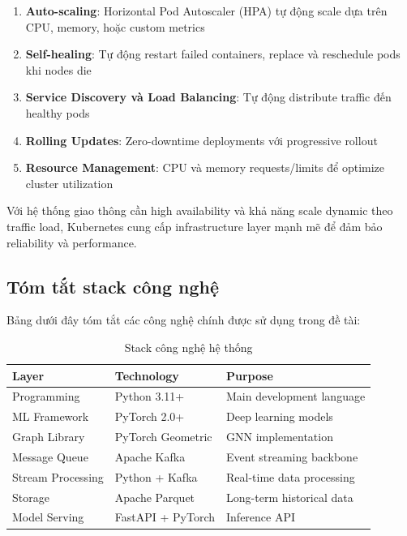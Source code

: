 \begin{enumerate}
    \item \textbf{Auto-scaling}: Horizontal Pod Autoscaler (HPA) tự động scale dựa trên CPU, memory, hoặc custom metrics
    
    \item \textbf{Self-healing}: Tự động restart failed containers, replace và reschedule pods khi nodes die
    
    \item \textbf{Service Discovery và Load Balancing}: Tự động distribute traffic đến healthy pods
    
    \item \textbf{Rolling Updates}: Zero-downtime deployments với progressive rollout
    
    \item \textbf{Resource Management}: CPU và memory requests/limits để optimize cluster utilization
\end{enumerate}

Với hệ thống giao thông cần high availability và khả năng scale dynamic theo traffic load, Kubernetes cung cấp infrastructure layer mạnh mẽ để đảm bảo reliability và performance.

\subsection{Tóm tắt stack công nghệ}

Bảng dưới đây tóm tắt các công nghệ chính được sử dụng trong đề tài:

\begin{table}[h]
\centering
\caption{Stack công nghệ hệ thống}
\begin{tabular}{|l|l|l|}
\hline
\textbf{Layer} & \textbf{Technology} & \textbf{Purpose} \\ \hline
Programming & Python 3.11+ & Main development language \\ \hline
ML Framework & PyTorch 2.0+ & Deep learning models \\ \hline
Graph Library & PyTorch Geometric & GNN implementation \\ \hline
Message Queue & Apache Kafka & Event streaming backbone \\ \hline
Stream Processing & Python + Kafka & Real-time data processing \\ \hline
Storage & Apache Parquet & Long-term historical data \\ \hline
Model Serving & FastAPI + PyTorch & Inference API \\ \hline
\end{tabular}
\label{tab:tech_stack}
\end{table}

